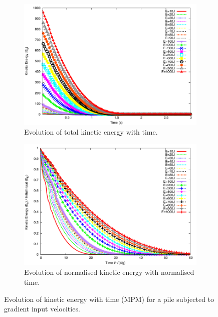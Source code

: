 \documentclass[3p,times,procedia,number]{elsarticle}
\begin{document}
\begin{figure}[tbhp]
  \centering
  \begin{subfigure}[b]{0.49\textwidth}
    \includegraphics[width=\textwidth]{figs/Energy_Slope}
    \caption{Evolution of total kinetic energy with time.}
    \label{fig:energy_slope}
  \end{subfigure}
  \begin{subfigure}[b]{0.49\textwidth}
    \centering
    \includegraphics[width=\textwidth]{figs/Normalised_Energy_Time_Slope}
    \caption{Evolution of normalised kinetic energy with normalised time.}
    \label{fig:Normalised_Energy_Time_Slope}
  \end{subfigure}
  \caption{Evolution of kinetic energy with time (MPM) for a pile subjected to 
  gradient input velocities.}
  \label{fig:Energy_Time_Slope}
\end{figure}
\end{document}
